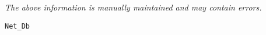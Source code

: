 \label{pkg:net\_db}

{\tiny \it The above information is manually maintained and may contain errors.}
\begin{verbatim}
Net_Db
\end{verbatim}
